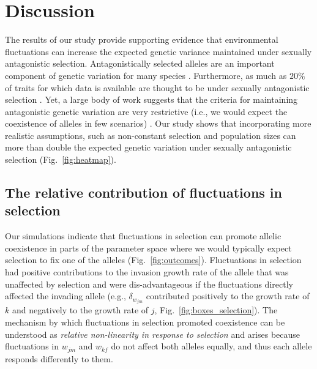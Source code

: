 
\section{Discussion}
The results of our study provide supporting evidence that environmental fluctuations can increase the expected genetic variance maintained under sexually antagonistic selection. Antagonistically selected alleles are an important component of genetic variation for many species \citep{foerster2007sexually,van2009intralocus,bonduriansky2009intralocus,innocenti2010sexually}. Furthermore, as much as $20\%$ of traits for which data is available are thought to be under sexually antagonistic selection \citep{morrissey2016meta}. Yet, a large body of work suggests that the criteria for maintaining antagonistic genetic variation are very restrictive (i.e., we would expect the coexistence of alleles in few scenarios) \citep{kidwell1977regions,pamilo1979genic,hedrick1999antagonistic,curtsinger1994antagonistic, patten2010fitness}. Our study shows that incorporating more realistic assumptions, such as non-constant selection and population sizes can more than double the expected genetic variation under sexually antagonistic selection (Fig.~\ref{fig:heatmap}).

\subsection*{The relative contribution of fluctuations in selection}


Our simulations indicate that fluctuations in selection can promote allelic coexistence in parts of the parameter space where we would typically expect selection to fix one of the alleles (Fig.~\ref{fig:outcomes}). Fluctuations in selection had positive contributions to the invasion growth rate of the allele that was unaffected by selection and were dis-advantageous if the fluctuations directly affected the invading allele  (e.g., $\delta_{w_{jm}}$ contributed positively to the growth rate of $k$ and negatively to the growth rate of $j$, Fig.~\ref{fig:boxes_selection}). The mechanism by which fluctuations in selection promoted coexistence can be understood as \textit{relative non-linearity in response to selection} and arises because fluctuations in $w_{jm}$ and $w_{kf}$ do not affect both alleles equally, and thus each allele responds differently to them.


